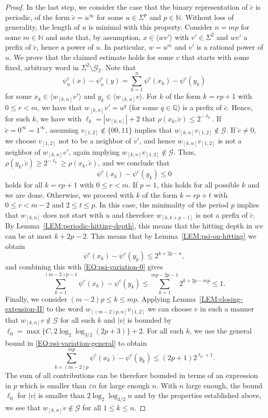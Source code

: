 \documentclass[10pt,a4paper]{amsart}
\newcommand{\N}{{\mathbb N}}
\newcommand{\Q}{{\mathbb Q}}
\newcommand{\mc}{\mathcal}
\begin{document}
\begin{proof}
In the last step, we consider the case that the binary representation of $\breve{c}$ is periodic, of the form $\breve{c} = u^\infty$ for some $u \in \Sigma^p$ and $p \in \N$.
Without loss of generality, the length of $u$ is minimal with this property. Consider $n = mp$ for some $m \in \N$ and note that, by assumption, $x \in \langle w v' \rangle$ with $v' \in \Sigma^2$ and $wv'$ a prefix of $\breve{c}$, hence a power of $u$. 
In particular, $w=u^m$ and $v'$ is a rational power of $u$. We prove that the claimed estimate holds for some $v$ that starts with some fixed, arbitrary word in $\Sigma^2 \setminus \mc G_2$. 
Note that 
\[
\psi^c_n(x) - \psi^c_n(y) = \sum_{k=1}^n \psi^c(x_k) - \psi^c(y_k)
\]
for some $x_k \in \langle w_{[k,n]} v' \rangle$ and $y_k \in \langle w_{[k,n]} v \rangle$.
For $k$ of the form $k = rp+1$ with $0\leqslant r < m$, we have that $w_{[k,n]} v' = u^q$ (for some $q \in \Q$) is a prefix of $\breve{c}$. Hence, for such $k$, we have with $\ell_k = |w_{[k,n]}| + 2$ that $\rho(x_k,\breve{c}) \leqslant 2^{-\ell_k}$.
If $\breve{c} = 0^{\infty} = 1^{\infty}$, assuming $v_{[1,2]} \notin \{00,11\}$ implies that $w_{[k,n]} v_{[1,2]} \notin \mc G$.
If $\breve{c} \neq 0$, we choose $v_{[1,2]}$  not to be a neighbor of $v'$, and hence $w_{[k,n]} v_{[1,2]}$ is not a neighbor of $w_{[k,n]}v'$, again implying $w_{[k,n]}v_{[1,2]} \notin \mc G$. Thus, $\rho(y_k,\breve{c}) \geqslant 2^{-\ell_k} \geqslant \rho(x_k,\breve{c})$, and we conclude that
\begin{equation}
\label{EQ:psi-variation-0}
\psi^c(x_k) - \psi^c(y_k) \leqslant 0
\end{equation}
holds for all $k=rp + 1$ with $0 \leqslant r < m$.
If $p=1$, this holds for all possible $k$ and we are done. Otherwise, we proceed with $k$ of the form $k = rp+ t$ with $0 \leqslant r < m-2$ and $2\leqslant t \leqslant p$. 
In this case, the minimality of the period $p$ implies that $w_{[k,n]}$ does not start with $u$ and therefore $w_{[k,k+p-1]}$ is not a prefix of $\breve{c}$. By Lemma~\ref{LEM:periodic-hitting-depth}, this means that the hitting depth in $wv$ can be at most $k+2p-2$. 
This means that by Lemma~\ref{LEM:psi-on-hitting} we obtain
\[
\psi^c(x_k) - \psi^c(y_k) \leqslant 2^{k+2p -n},
\]
and combining this with \eqref{EQ:psi-variation-0}
gives
\[
\sum_{k=1}^{(m-2)p - 1} \psi^c(x_k) - \psi^c(y_k)
\leqslant \sum_{k=1}^{mp - 2p - 1} 2^{k+2p -mp} \leqslant 1.
\]
Finally, we consider $(m-2)p \leqslant k \leqslant mp$. Applying Lemma~\ref{LEM:closing-extension-II} to the word $w_{[(m-2)p,n]} v_{[1,2]}$ we can choose $v$ in such a manner that $w_{[k,n]} v \notin \mc G$ for all such $k$ and $|v|$ is bounded by $\ell_0 = \max \{ C ,2\log_2 \log_{3/2} (2p + 3) \} + 2$. 
For all such $k$, we use the general bound in \eqref{EQ:psi-variation-general} to obtain
\[
\sum_{k = (m-2)p}^{mp} \psi^c(x_k) - \psi^c(y_k)
\leqslant (2p + 1) 2^{\ell_0 + 1}.
\]
The sum of all contributions can be therefore bounded in terms of an expression in $p$ which is smaller than $\varepsilon n$ for large enough $n$.
With $n$ large enough, the bound $\ell_0$ for $|v|$ is smaller than $2 \log_2 \log_{3/2} n$ and by the properties established above, we see that $w_{[k,n]}v \notin \mc G$ for all $1\leqslant k \leqslant n$.
\end{proof}
\end{document}
